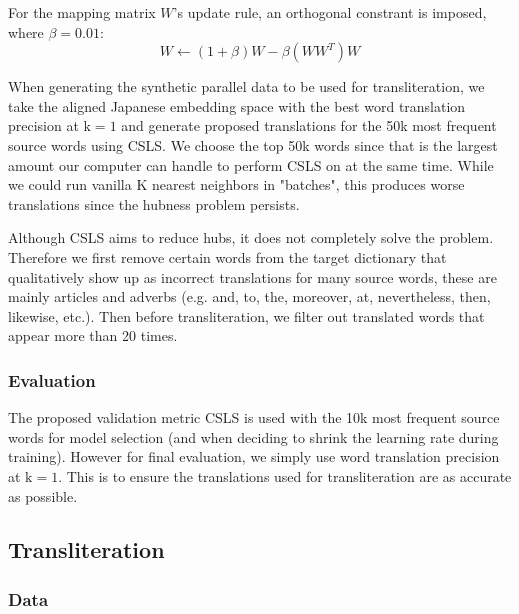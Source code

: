 \documentclass{article}
\begin{document}
\noindent
For the mapping matrix $W$'s update rule, an orthogonal constrant is imposed, where
$\beta=0.01$:
$$
W \leftarrow (1 + \beta)W - \beta(WW^T)W
$$

When generating the synthetic parallel data to be used for transliteration, we take
the aligned Japanese embedding space with the best word translation precision
at $\text{k}=1$ and generate proposed translations for the 50k most frequent
source words using CSLS. We choose the top 50k words since that is the largest
amount our computer can handle to perform CSLS on at the same time. While we could
run vanilla K nearest neighbors in "batches", this produces worse translations
since the hubness problem persists.

Although CSLS aims to reduce hubs, it does not completely solve the problem.
Therefore we first remove certain words from the target dictionary that qualitatively
show up as incorrect translations for many source words, these are mainly articles
and adverbs (e.g. and, to, the, moreover, at, nevertheless, then, likewise, etc.).
Then before transliteration, we filter out translated words that appear more than
20 times.

\subsubsection*{Evaluation}

The proposed validation metric CSLS is used with the 10k most frequent source words
for model selection (and when deciding to shrink the learning rate during training).
However for final evaluation, we simply use word translation precision at
$\text{k}=1$. This is to ensure the translations used for transliteration are as
accurate as possible.

\subsection*{Transliteration}

\subsubsection*{Data}
\end{document}
